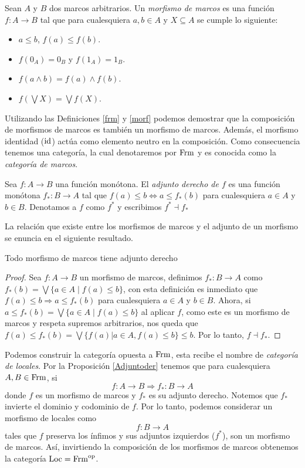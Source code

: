\begin{dfn}\label{morf}
Sean $A$ y $B$ dos marcos arbitrarios. Un \emph{morfismo de marcos} es una función $f\colon A\rightarrow B$ tal que para cualesquiera $a,b\in A$ y $X\subseteq A$ se cumple lo siguiente:
\begin{itemize}
\item $a\leq b$, $f(a)\leq f(b)$.
\item $f(0_A)=0_B$ y $f(1_A)=1_B$.
\item $f(a\wedge b)= f(a)\wedge f(b)$.
\item $f(\bigvee X)=\bigvee f(X)$.
\end{itemize}
\end{dfn}

Utilizando las Definiciones \ref{frm} y \ref{morf} podemos demostrar que la composición de morfismos de marcos es también un morfismo de marcos. Además, el morfismo identidad ($\mathrm{id}$) actúa como elemento neutro en la composición. Como consecuencia tenemos una categoría, la cual denotaremos por $\mathrm{Frm}$ y es conocida como la \emph{categoría de marcos}.

\begin{dfn}\label{adjder}
Sea $f:A\to B$ una función monótona. El \emph{adjunto derecho de $f$} es una función monótona $f_*:B\to A$ tal que $f(a)\leq b\Leftrightarrow a\leq f_*(b)$ para cualesquiera $a\in A$ y $b\in B$. Denotamos a $f$ como $f^*$ y escribimos \emph{$f^*\dashv f_*$}
\end{dfn}

La relación que existe entre los morfismos de marcos y el adjunto de un morfismo se enuncia en el siguiente resultado.

\begin{prop}\label{Adjuntoder}
Todo morfismo de marcos tiene adjunto derecho
\end{prop}

\begin{proof}
Sea $f\colon A\rightarrow B$ un morfismo de marcos, definimos $f_{*}\colon B\to A$ como $f_{*}(b)=\bigvee\{a\in A\mid f(a)\leq b\}$, con esta definición es inmediato que $f(a)\leq b\Rightarrow a\leq f_{*}(b)$ para cualesquiera $a\in A$ y $b\in B$. Ahora, si $a\leq f_{*}(b)=\bigvee \{a\in A\mid f(a)\leq b\}$ al aplicar $f$, como este es un morfismo de marcos y respeta supremos arbitrarios, nos queda que $f(a)\leq f_{*}(b)=\bigvee \{f(a)|a\in A, f(a)\leq b\}\leq b$. Por lo tanto, $f\dashv f_{*}$.
\end{proof}

Podemos construir la categoría opuesta a $\mathrm{Frm}$, esta recibe el nombre de \emph{categoría de locales}. Por la Proposición \ref{Adjuntoder} tenemos que para cualesquiera $A, B\in \mathrm{Frm}$, si
\[
f\colon A\rightarrow B \Longrightarrow f_*\colon B\rightarrow A
\]
donde $f$ es un morfismo de marcos y $f_*$ es su adjunto derecho. Notemos que $f_*$ invierte el dominio y codominio de $f$. Por lo tanto, podemos considerar un morfismo de locales como 
\[
f\colon B\rightarrow A 
\]
tales que $f$ preserva los ínfimos y sus adjuntos izquierdos ($f^*$), son un morfismo de marcos. Así, invirtiendo la composición de los morfismos de marcos obtenemos la categoría $\mathrm{Loc}=\mathrm{Frm}^{\mathrm{op}}$.\\

